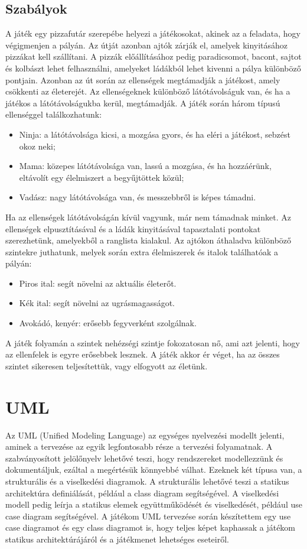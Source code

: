 \documentclass[12pt, a4paper]{report}
\theoremstyle{definition}
\begin{document}
	\subsection{Szabályok}
	A játék egy pizzafutár szerepébe helyezi a játékosokat, akinek az a feladata, hogy végigmenjen a pályán. Az útját azonban ajtók zárják el, amelyek kinyitásához pizzákat kell szállítani. A pizzák előállításához pedig paradicsomot, bacont, sajtot és kolbászt lehet felhasználni, amelyeket ládákból lehet kivenni a pálya különböző pontjain. Azonban az út során az ellenségek megtámadják a játékost, amely csökkenti az életerejét. Az ellenségeknek különböző látótávolságuk van, és ha a játékos a látótávolságukba kerül, megtámadják. A játék során három típusú ellenséggel találkozhatunk:
	\begin{itemize} 
		\item Ninja: a látótávolsága kicsi, a mozgása gyors, és ha eléri a játékost, sebzést okoz neki; 
		\item Mama: közepes látótávolsága van, lassú a mozgása, és ha hozzáérünk, eltávolít egy élelmiszert a begyűjtöttek közül; 
		\item Vadász: nagy látótávolsága van, és messzebbről is képes támadni.
	\end{itemize}
	Ha az ellenségek látótávolságán kívül vagyunk, már nem támadnak minket. Az ellenségek elpusztításával és a ládák kinyitásával tapasztalati pontokat szerezhetünk, amelyekből a ranglista kialakul. Az ajtókon áthaladva különböző szintekre juthatunk, melyek során extra élelmiszerek és italok találhatóak a pályán:
	\begin{itemize} 
		\item Piros ital: segít növelni az aktuális életerőt.
		\item Kék ital: segít növelni az ugrásmagasságot.
		\item Avokádó, kenyér: erősebb fegyverként szolgálnak.
	\end{itemize}
	A játék folyamán a szintek nehézségi szintje fokozatosan nő, ami azt jelenti, hogy az ellenfelek is egyre erősebbek lesznek. A játék akkor ér véget, ha az összes szintet sikeresen teljesítettük, vagy elfogyott az életünk.
	
	\section{UML}
	Az UML (Unified Modeling Language) az egységes nyelvezési modellt jelenti, aminek a tervezése az egyik legfontosabb része a tervezési folyamatnak. A szabványosított jelölőnyelv lehetővé teszi, hogy rendszereket modellezzünk és dokumentáljuk, ezáltal a megértésük könnyebbé válhat. Ezeknek két típusa van, a strukturális és a viselkedési diagramok. A strukturális lehetővé teszi a statikus architektúra definiálását, például a class diagram segítségével. A viselkedési modell pedig leírja a statikus elemek együttműködését és viselkedését, például use case diagram segítségével. A játékom UML tervezése során készítettem egy use case diagramot és egy class diagramot is, hogy teljes képet kaphassak a játékom statikus architektúrájáról és a játékmenet lehetséges eseteiről.
	
\end{document}
